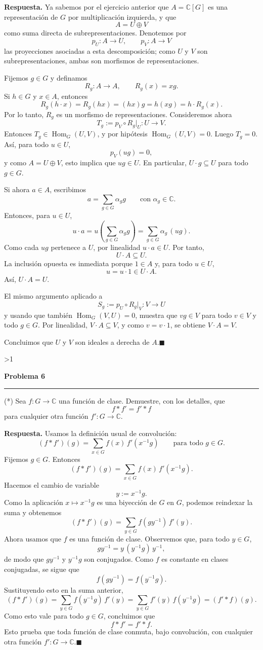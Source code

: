 \documentclass[10pt,a4paper]{article}
\newcommand{\CC}{\mathbb{C}}
\newcommand{\inlinehead}[2][repblue]{%
  \par\smallskip
  {\color{#1}\bfseries #2.}\hspace{0.45em}%
}
\newcounter{probcnt}
\newcommand{\problem}[2]{%
  \stepcounter{probcnt}%
  \ifnum\value{probcnt}>1\newpage\fi
  \par\vspace{0.25em}
  {\large\bfseries\color{repblue} Problema #1}\par
  {\color{repline}\rule{\linewidth}{0.55pt}}\par
  \begin{tcolorbox}[
    breakable,
    colback=white,
    colframe=repline,
    borderline west={1.6pt}{0pt}{repteal},
    left=0.7em,
    right=0.7em,
    top=0.35em,
    bottom=0.3em,
    before skip=0.35em,
    after skip=0.45em
  ]
    #2
  \end{tcolorbox}
}
\begin{document}
\inlinehead{Respuesta} Ya sabemos por el ejercicio anterior que $A=\CC[G]$
es una representación de $G$ por multiplicación izquierda, y que
\[
  A=U\oplus V
\]
como suma directa de subrepresentaciones. Denotemos por
\[
  p_U\colon A\to U,
  \qquad
  p_V\colon A\to V
\]
las proyecciones asociadas a esta descomposición; como $U$ y $V$ son
subrepresentaciones, ambas son morfismos de representaciones.

Fijemos $g\in G$ y definamos
\[
  R_g\colon A\to A,
  \qquad
  R_g(x)=xg.
\]
Si $h\in G$ y $x\in A$, entonces
\[
  R_g(h\cdot x)=R_g(hx)=(hx)g=h(xg)=h\cdot R_g(x).
\]
Por lo tanto, $R_g$ es un morfismo de representaciones. Consideremos ahora
\[
  T_g:=p_V\circ R_g|_U\colon U\to V.
\]
Entonces $T_g\in \operatorname{Hom}_G(U,V)$, y por hipótesis
$\operatorname{Hom}_G(U,V)=0$. Luego $T_g=0$. Así, para todo $u\in U$,
\[
  p_V(ug)=0,
\]
y como $A=U\oplus V$, esto implica que $ug\in U$. En particular,
$U\cdot g\subseteq U$ para todo $g\in G$.

Si ahora $a\in A$, escribimos
\[
  a=\sum_{g\in G}\alpha_g g
  \qquad\text{con } \alpha_g\in\CC.
\]
Entonces, para $u\in U$,
\[
  u\cdot a
  =u\left(\sum_{g\in G}\alpha_g g\right)
  =\sum_{g\in G}\alpha_g\,(ug).
\]
Como cada $ug$ pertenece a $U$, por linealidad $u\cdot a\in U$. Por tanto,
\[
  U\cdot A\subseteq U.
\]
La inclusión opuesta es inmediata porque $1\in A$ y, para todo $u\in U$,
\[
  u=u\cdot 1\in U\cdot A.
\]
Así, $U\cdot A=U$.

El mismo argumento aplicado a
\[
  S_g:=p_U\circ R_g|_V\colon V\to U
\]
y usando que también $\operatorname{Hom}_G(V,U)=0$, muestra que $vg\in V$
para todo $v\in V$ y todo $g\in G$. Por linealidad, $V\cdot A\subseteq V$,
y como $v=v\cdot 1$, se obtiene $V\cdot A=V$.

Concluimos que $U$ y $V$ son ideales a derecha de $A$.\hfill$\blacksquare$

\problem{6}{%
(*) Sea $f\colon G\to\CC$ una función de clase. Demuestre, con los detalles,
que
\[
  f * f' = f' * f
\]
para cualquier otra función $f'\colon G\to\CC$.
}

\inlinehead{Respuesta} Usamos la definición usual de convolución:
\[
  (f*f')(g)=\sum_{x\in G} f(x)\,f'(x^{-1}g)
  \qquad\text{para todo } g\in G.
\]
Fijemos $g\in G$. Entonces
\[
  (f*f')(g)=\sum_{x\in G} f(x)\,f'(x^{-1}g).
\]
Hacemos el cambio de variable
\[
  y:=x^{-1}g.
\]
Como la aplicación $x\mapsto x^{-1}g$ es una biyección de $G$ en $G$, podemos
reindexar la suma y obtenemos
\[
  (f*f')(g)=\sum_{y\in G} f(gy^{-1})\,f'(y).
\]
Ahora usamos que $f$ es una función de clase. Observemos que, para todo
$y\in G$,
\[
  gy^{-1}=y\,(y^{-1}g)\,y^{-1},
\]
de modo que $gy^{-1}$ y $y^{-1}g$ son conjugados. Como $f$ es constante en
clases conjugadas, se sigue que
\[
  f(gy^{-1})=f(y^{-1}g).
\]
Sustituyendo esto en la suma anterior,
\[
  (f*f')(g)=\sum_{y\in G} f(y^{-1}g)\,f'(y)
  =\sum_{y\in G} f'(y)\,f(y^{-1}g)
  =(f'*f)(g).
\]
Como esto vale para todo $g\in G$, concluimos que
\[
  f*f'=f'*f.
\]
Esto prueba que toda función de clase conmuta, bajo convolución, con cualquier
otra función $f'\colon G\to\CC$.\hfill$\blacksquare$
\end{document}
